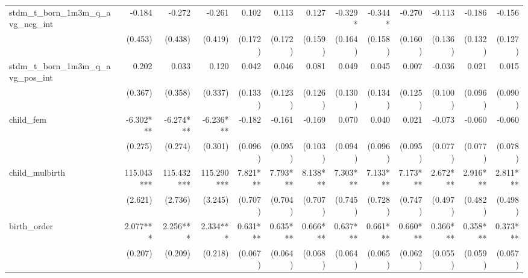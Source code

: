 \begin{tabular}{lrrrrrrrrrrrr}
stdm\_t\_born\_1m3m\_q\_avg\_neg\_int       &       -0.184 &       -0.272 &       -0.261 &        0.102 &        0.113 &        0.127 &      -0.329* &      -0.344* &       -0.270 &       -0.113 &       -0.186 &       -0.156 \\ 
                                            &      (0.453) &      (0.438) &      (0.419) &      (0.172) &      (0.172) &      (0.159) &      (0.164) &      (0.158) &      (0.160) &      (0.136) &      (0.132) &      (0.127) \\ 
stdm\_t\_born\_1m3m\_q\_avg\_pos\_int       &        0.202 &        0.033 &        0.120 &        0.042 &        0.046 &        0.081 &        0.049 &        0.045 &        0.007 &       -0.036 &        0.021 &        0.015 \\ 
                                            &      (0.367) &      (0.358) &      (0.337) &      (0.133) &      (0.123) &      (0.126) &      (0.130) &      (0.134) &      (0.125) &      (0.100) &      (0.096) &      (0.090) \\ 
child\_fem                                  &    -6.302*** &    -6.274*** &    -6.236*** &       -0.182 &       -0.161 &       -0.169 &        0.070 &        0.040 &        0.021 &       -0.073 &       -0.060 &       -0.060 \\ 
                                            &      (0.275) &      (0.274) &      (0.301) &      (0.096) &      (0.095) &      (0.103) &      (0.094) &      (0.096) &      (0.095) &      (0.077) &      (0.077) &      (0.078) \\ 
child\_mulbirth                             &   115.043*** &   115.432*** &   115.290*** &     7.821*** &     7.793*** &     8.138*** &     7.303*** &     7.133*** &     7.173*** &     2.672*** &     2.916*** &     2.811*** \\ 
                                            &      (2.621) &      (2.736) &      (3.245) &      (0.707) &      (0.704) &      (0.707) &      (0.745) &      (0.728) &      (0.747) &      (0.497) &      (0.482) &      (0.498) \\ 
birth\_order                                &     2.077*** &     2.256*** &     2.334*** &     0.631*** &     0.635*** &     0.666*** &     0.637*** &     0.661*** &     0.660*** &     0.366*** &     0.358*** &     0.373*** \\ 
                                            &      (0.207) &      (0.209) &      (0.218) &      (0.067) &      (0.064) &      (0.068) &      (0.064) &      (0.065) &      (0.062) &      (0.055) &      (0.059) &      (0.057) \\ 

\end{tabular}
